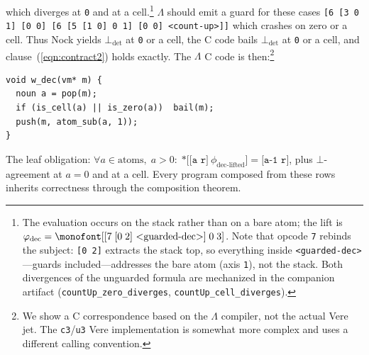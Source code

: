 \documentclass[twoside]{article}
\begin{document}
\noindent
which diverges at \lstinline[style=inlinecode]{0} and at a cell.\footnote{The evaluation occurs on the stack rather than on a bare atom; the lift is $\varphi_\text{dec} = \texttt{[[7\;[0\;2]\ <guarded-dec>]\;0\;3]}$.  Note that opcode \texttt{7} rebinds the subject: \texttt{[0 2]} extracts the stack top, so everything inside \texttt{<guarded-dec>}---guards included---addresses the bare atom (axis \texttt{1}), not the stack.  Both divergences of the unguarded formula are mechanized in the companion artifact (\texttt{countUp\_zero\_diverges}, \texttt{countUp\_cell\_diverges}).}  $\Lambda$ should emit a guard for these cases \lstinline[style=inlinecode]{[6 [3 0 1] [0 0] [6 [5 [1 0] 0 1] [0 0] <count-up>]]} which crashes on zero or a cell.  Thus Nock yields $\bot_\text{det}$ at \lstinline[style=inlinecode]{0} or a cell, the C code bails $\bot_\text{det}$ at \lstinline[style=inlinecode]{0} or a cell, and clause~(\ref{eqn:contract2}) holds exactly.  The $\Lambda$ C code is then:\footnote{We show a C correspondence based on the $\Lambda$ compiler, not the actual Vere jet.  The \texttt{c3}/\texttt{u3} Vere implementation is somewhat more complex and uses a different calling convention.}

\begin{lstlisting}[style=listingcode_c]
void w_dec(vm* m) {
  noun a = pop(m);
  if (is_cell(a) || is_zero(a))  bail(m);
  push(m, atom_sub(a, 1));
}
\end{lstlisting}

\noindent
The leaf obligation:  $\forall a \in \text{atoms},\; a > 0: \;\texttt{*[[a\ r]}\ \phi_\text{dec-lifted}\texttt{]} = \texttt{[a-1\ r]}$, plus $\bot$-agreement at $a=0$ and at a cell.  Every program composed from these rows inherits correctness through the composition theorem.
\end{document}
